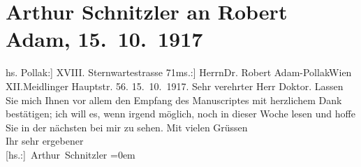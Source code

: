 

         
         \renewcommand{\erwaehntePersonen}{Personen: Robert Adam, Frieda Pollak}
         \renewcommand{\erwaehnteOrte}{Orte: Meidlinger Hauptstraße, Sternwartestraße, Wien, XII., Meidling}
         \renewcommand{\erwaehnteWerke}{Werke: Das Ende des Judas}
               \section[Arthur Schnitzler an Robert Adam, 15. 10. 1917]{ Arthur Schnitzler an Robert Adam, 15. 10. 1917}\nopagebreak{}\rehead{ }\begin{ledgroupsized}[t]{13cm}\normalsize\beginnumbering \toendnotes[C]{\smallbreak\pagebreak[2]} 
\toendnotes[C]{\smallbreak}\pstart{}{\pb}{[}hs. Pollak:{]} XVIII. Sternwartestrasse 71\pend{}{\bigskip}\pstart{}{[}ms.:{]} Herrn\pend{}\pstart{}Dr. Robert Adam-\pend{}\pstart{}Pollak\pend{}\pstart{}Wien XII.\pend{}\pstart{}Meidlinger Hauptstr. 56.\pend{}{\bigskip}\pstart
           \raggedleft{}{\pb}15. 10. 1917.\pend
           \pstart{}Sehr verehrter Herr Doktor.\pend\pstart
           Lassen Sie mich Ihnen vor allem den Empfang des Manuscriptes mit herzlichem Dank bestätigen; ich will es,
               wenn irgend möglich, noch in dieser Woche lesen und hoffe Sie in der nächsten bei mir
               zu sehen.\pend
           \pstart
           Mit vielen Grüssen{\\[\baselineskip]}Ihr sehr ergebener{\\[\baselineskip]}\spacefill\mbox{{[}hs.:{]} Arthur Schnitzler}\pend
           \leftskip=0em{}
         
         \endnumbering{}\end{ledgroupsized}  \newcommand{\dateiname}{L02276}\newcommand{\titel}{Arthur Schnitzler an Robert Adam, 15. 10. 1917}\newcommand{\editorInnen}{Martin Anton Müller und Gerd-Hermann Susen}
      